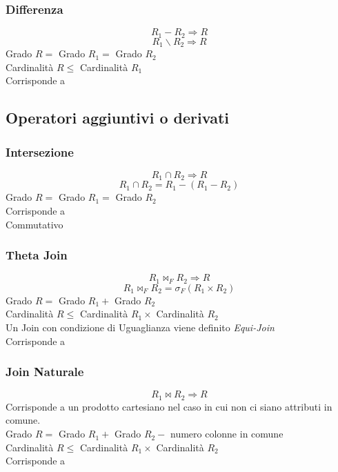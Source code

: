\subsubsection{Differenza}
$$R_1 - R_2 \Rightarrow R$$
$$R_1 \backslash R_2 \Rightarrow R$$
Grado $R =$ Grado $R_1 =$ Grado $R_2$\\
Cardinalità $R \leq$ Cardinalità $R_1$\\
Corrisponde a 

\subsection{Operatori aggiuntivi o derivati}
\subsubsection{Intersezione}
$$R_1 \cap R_2 \Rightarrow R$$
$$R_1 \cap R_2 = R_1 - (R_1 - R_2)$$
Grado $R =$ Grado $R_1 =$ Grado $R_2$\\
Corrisponde a \\
Commutativo

\subsubsection{Theta Join}
$$R_1 \bowtie_{F} R_2 \Rightarrow R$$
$$R_1 \bowtie_{F} R_2 = \sigma_{F}(R_1 \times R_2)$$
Grado $R =$ Grado $R_1 +$ Grado $R_2$\\
Cardinalità $R \leq$ Cardinalità $R_1 \times$ Cardinalità $R_2$\\
Un Join con condizione di Uguaglianza viene definito \textit{Equi-Join}\\
Corrisponde a 

\subsubsection{Join Naturale}
$$R_1 \bowtie R_2 \Rightarrow R$$
Corrisponde a un prodotto cartesiano nel caso in cui non ci siano attributi in comune.\\
Grado $R =$ Grado $R_1 +$ Grado $R_2 -$ numero colonne in comune\\
Cardinalità $R \leq$ Cardinalità $R_1 \times$ Cardinalità $R_2$\\
Corrisponde a 

